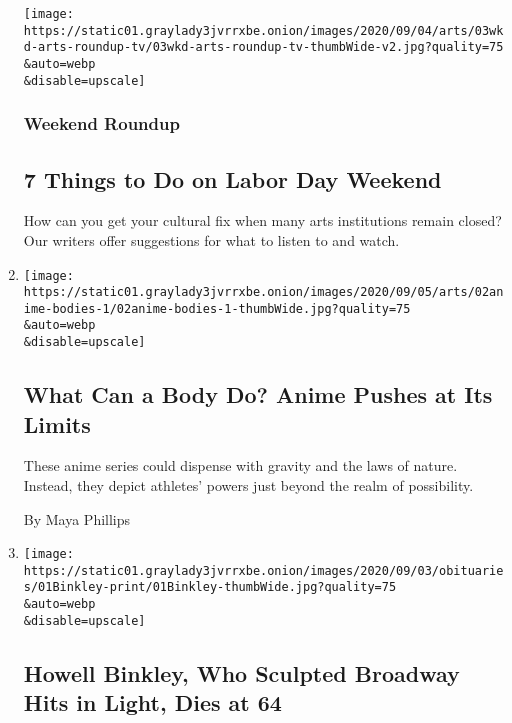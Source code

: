 \begin{enumerate}
  \texttt{[image: https://static01.graylady3jvrrxbe.onion/images/2020/09/04/arts/03wkd-arts-roundup-tv/03wkd-arts-roundup-tv-thumbWide-v2.jpg?quality=75\\\&auto=webp\\\&disable=upscale]}

  \hypertarget{weekend-roundup-1}{%
  \subsubsection{Weekend Roundup}\label{weekend-roundup-1}}

  \hypertarget{7-things-to-do-on-labor-day-weekend}{%
  \subsection{7 Things to Do on Labor Day
  Weekend}\label{7-things-to-do-on-labor-day-weekend}}

  How can you get your cultural fix when many arts institutions remain
  closed? Our writers offer suggestions for what to listen to and watch.
\item
  \href{/2020/09/02/arts/dance/anime-sports.html}{}

  \texttt{[image: https://static01.graylady3jvrrxbe.onion/images/2020/09/05/arts/02anime-bodies-1/02anime-bodies-1-thumbWide.jpg?quality=75\\\&auto=webp\\\&disable=upscale]}

  \hypertarget{what-can-a-body-do-anime-pushes-at-its-limits}{%
  \subsection{What Can a Body Do? Anime Pushes at Its
  Limits}\label{what-can-a-body-do-anime-pushes-at-its-limits}}

  These anime series could dispense with gravity and the laws of nature.
  Instead, they depict athletes' powers just beyond the realm of
  possibility.

  By Maya Phillips
\item
  \href{/2020/09/02/theater/howell-binkley-dead.html}{}

  \texttt{[image: https://static01.graylady3jvrrxbe.onion/images/2020/09/03/obituaries/01Binkley-print/01Binkley-thumbWide.jpg?quality=75\\\&auto=webp\\\&disable=upscale]}

  \hypertarget{howell-binkley-who-sculpted-broadway-hits-in-light-dies-at-64}{%
  \subsection{Howell Binkley, Who Sculpted Broadway Hits in Light, Dies
  at
  64}\label{howell-binkley-who-sculpted-broadway-hits-in-light-dies-at-64}}


\end{enumerate}
